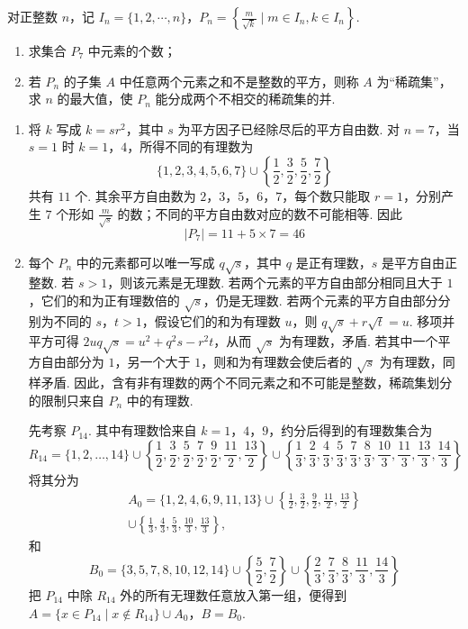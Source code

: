 \begin{problem}
对正整数 \(n\)，记 \(I_n = \{1, 2, \cdots, n\}\)，\(P_n = \left\{\frac{m}{\sqrt{k}} \mid m \in I_n, k \in I_n\right\}\).
\begin{enumerate}
\item 求集合 \(P_{7}\) 中元素的个数；
\item 若 \(P_{n}\) 的子集 \(A\) 中任意两个元素之和不是整数的平方，则称 \(A\) 为“稀疏集”，求 \(n\) 的最大值，使 \(P_{n}\) 能分成两个不相交的稀疏集的并.
\end{enumerate}

\begin{solution}
\begin{enumerate}
\item 将 \(k\) 写成 \(k=sr^2\)，其中 \(s\) 为平方因子已经除尽后的平方自由数. 对 \(n=7\)，当 \(s=1\) 时 \(k=1\)，\(4\)，所得不同的有理数为
\[
\{1,2,3,4,5,6,7\}\cup\left\{\frac12,\frac32,\frac52,\frac72\right\}
\]
共有 \(11\) 个. 其余平方自由数为 \(2\)，\(3\)，\(5\)，\(6\)，\(7\)，每个数只能取 \(r=1\)，分别产生 \(7\) 个形如 \(\frac{m}{\sqrt{s}}\) 的数；不同的平方自由数对应的数不可能相等. 因此
\[
|P_7|=11+5\times7=46
\]

\item 每个 \(P_n\) 中的元素都可以唯一写成 \(q\sqrt{s}\)，其中 \(q\) 是正有理数，\(s\) 是平方自由正整数. 若 \(s>1\)，则该元素是无理数. 若两个元素的平方自由部分相同且大于 \(1\)，它们的和为正有理数倍的 \(\sqrt{s}\)，仍是无理数. 若两个元素的平方自由部分分别为不同的 \(s\)，\(t>1\)，假设它们的和为有理数 \(u\)，则 \(q\sqrt{s}+r\sqrt{t}=u\). 移项并平方可得 \(2uq\sqrt{s}=u^2+q^2s-r^2t\)，从而 \(\sqrt{s}\) 为有理数，矛盾. 若其中一个平方自由部分为 \(1\)，另一个大于 \(1\)，则和为有理数会使后者的 \(\sqrt{s}\) 为有理数，同样矛盾. 因此，含有非有理数的两个不同元素之和不可能是整数，稀疏集划分的限制只来自 \(P_n\) 中的有理数.

先考察 \(P_{14}\). 其中有理数恰来自 \(k=1\)，\(4\)，\(9\)，约分后得到的有理数集合为
\[
R_{14}=\{1,2,\ldots,14\}\cup\left\{\frac12,\frac32,\frac52,\frac72,\frac92,\frac{11}{2},\frac{13}{2}\right\}\cup\left\{\frac13,\frac23,\frac43,\frac53,\frac73,\frac83,\frac{10}{3},\frac{11}{3},\frac{13}{3},\frac{14}{3}\right\}
\]
将其分为
\[
\begin{gathered}
A_0=\{1,2,4,6,9,11,13\}\cup\left\{\frac12,\frac32,\frac92,\frac{11}{2},\frac{13}{2}\right\}\\
\cup\left\{\frac13,\frac43,\frac53,\frac{10}{3},\frac{13}{3}\right\},
\end{gathered}
\]
和
\[
B_0=\{3,5,7,8,10,12,14\}\cup\left\{\frac52,\frac72\right\}\cup\left\{\frac23,\frac73,\frac83,\frac{11}{3},\frac{14}{3}\right\}
\]
把 \(P_{14}\) 中除 \(R_{14}\) 外的所有无理数任意放入第一组，便得到
\(A=\{x\in P_{14}\mid x\notin R_{14}\}\cup A_0\)，\(B=B_0\).


\end{enumerate}
\end{solution}
\end{problem}
